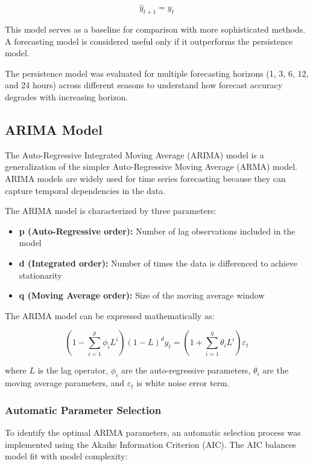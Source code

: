 \documentclass[12pt,a4paper]{article}
\begin{document}
\begin{equation}
\hat{y}_{t+1} = y_t
\end{equation}

This model serves as a baseline for comparison with more sophisticated methods. A forecasting model is considered useful only if it outperforms the persistence model.

The persistence model was evaluated for multiple forecasting horizons (1, 3, 6, 12, and 24 hours) across different seasons to understand how forecast accuracy degrades with increasing horizon.

\subsection{ARIMA Model}

The Auto-Regressive Integrated Moving Average (ARIMA) model is a generalization of the simpler Auto-Regressive Moving Average (ARMA) model. ARIMA models are widely used for time series forecasting because they can capture temporal dependencies in the data.

The ARIMA model is characterized by three parameters:
\begin{itemize}
\item \textbf{p (Auto-Regressive order):} Number of lag observations included in the model
\item \textbf{d (Integrated order):} Number of times the data is differenced to achieve stationarity
\item \textbf{q (Moving Average order):} Size of the moving average window
\end{itemize}

The ARIMA model can be expressed mathematically as:

\begin{equation}
\left(1 - \sum_{i=1}^{p} \phi_i L^i\right) (1-L)^d y_t = \left(1 + \sum_{i=1}^{q} \theta_i L^i\right) \varepsilon_t
\label{eq:arima}
\end{equation}

where $L$ is the lag operator, $\phi_i$ are the auto-regressive parameters, $\theta_i$ are the moving average parameters, and $\varepsilon_t$ is white noise error term.

\subsubsection{Automatic Parameter Selection}

To identify the optimal ARIMA parameters, an automatic selection process was implemented using the Akaike Information Criterion (AIC). The AIC balances model fit with model complexity:
\end{document}
